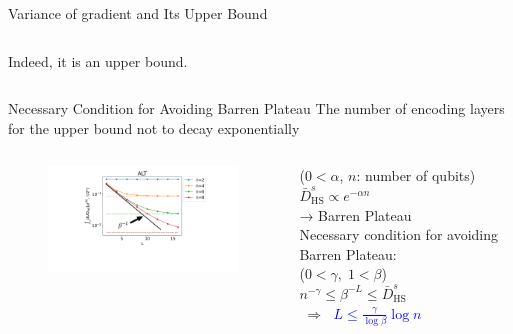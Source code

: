 \documentclass[dvipdfmx,10pt,aspectratio=169]{beamer}
\begin{document}
\begin{frame}{Variance of gradient and Its Upper Bound}
\begin{columns}
\begin{column}{0.5\textwidth}
\begin{figure}[H]
            \end{figure}
            \begin{center}
                Indeed, it is an upper bound.
            \end{center}
        \end{column}
    \end{columns}
\end{frame}




\begin{frame}{Necessary Condition for Avoiding Barren Plateau}
    The number of encoding layers for the upper bound not to decay exponentially\\
    \vspace*{10pt}
    \begin{columns}
        \begin{column}{0.65\textwidth}
            \begin{figure}
                \centering\includegraphics[width=8cm]{hsd-alt-analytical-with-line.pdf}
            \end{figure}
        \end{column}

        \begin{column}{0.35\textwidth}
            {\footnotesize($0<\alpha$, $n$: number of qubits)}\\
            \vspace*{2pt}
            $\bar{D}_{\mathrm{HS}}^s \propto e^{-\alpha n}$\\
            → Barren Plateau\\

            \vspace*{10pt}
            Necessary condition for avoiding Barren Plateau:\\
            {\footnotesize($0<\gamma,\;1<\beta$)}\\
            \vspace*{2pt}
            $n^{-\gamma} \leq \beta^{-L} \leq \bar{D}_{\mathrm{HS}}^s$\\
            \vspace*{2pt}
            \hspace*{5pt}$\;\Longrightarrow\;$ \textcolor{blue}{$L \leq \frac{\gamma}{\log{\beta}}\log{n}$}


\end{column}
\end{columns}
\end{frame}
\end{document}
